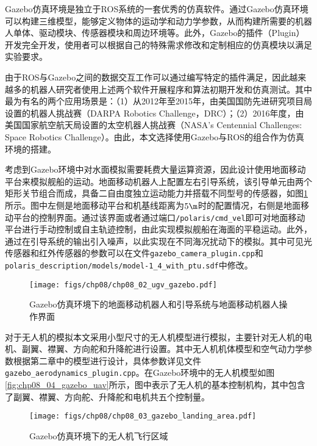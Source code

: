 Gazebo仿真环境是独立于ROS系统的一套优秀的仿真软件。通过Gazebo仿真环境可以构建三维模型，能够定义物体的运动学和动力学参数，从而构建所需要的机器人单体、驱动模块、传感器模块和周边环境等。此外，Gazebo的插件（Plugin）开发完全开发，使用者可以根据自己的特殊需求修改和定制相应的仿真模块以满足实验要求。

由于ROS与Gazebo之间的数据交互工作可以通过编写特定的插件满足，因此越来越多的机器人研究者使用上述两个软件开展程序和算法初期开发和仿真测试。其中最为有名的两个应用场景是：（1）从2012年至2015年，由美国国防先进研究项目局设置的机器人挑战赛（DARPA Robotics Challenge，DRC）\cite{gazebo_darpa}；（2）2016年度，由美国国家航空航天局设置的太空机器人挑战赛（NASA's Centennial Challenges: Space Robotics Challenge）\cite{gazebo_nasa}。由此，本文选择使用Gazebo与ROS的组合作为仿真环境的搭建。

考虑到Gazebo环境中对水面模拟需要耗费大量运算资源，因此设计使用地面移动平台来模拟舰船的运动。地面移动机器人上配置左右引导系统，该引导单元由两个矩形关节组合而成，具备二自由度独立运动能力并搭载不同型号的传感器，如图\ref{fig:chp08_02_ugv_gazebo}所示。图中左侧是地面移动平台和机基线距离为$5 \m$时的配置情况，右侧是地面移动平台的控制界面。通过该界面或者通过端口\texttt{/polaris/cmd\_vel}即可对地面移动平台进行手动控制或自主轨迹控制，由此实现模拟舰船在海面的平稳运动。此外，通过在引导系统的输出引入噪声，以此实现在不同海况扰动下的模拟。其中可见光传感器和红外传感器的参数可以在文件\texttt{gazebo\_camera\_plugin.cpp}和\texttt{polaris\_description/models/model-1\_4\_with\_ptu.sdf}中修改。

\begin{figure}[!t]
	\centering
	\texttt{[image: figs/chp08/chp08\_02\_ugv\_gazebo.pdf]}	
	\caption{Gazebo仿真环境下的地面移动机器人和引导系统与地面移动机器人操作界面}
	\label{fig:chp08_02_ugv_gazebo}
\end{figure}

对于无人机的模拟本文采用小型尺寸的无人机模型进行模拟，主要针对无人机的电机、副翼、襟翼、方向舵和升降舵进行设置。其中无人机机体模型和空气动力学参数根据第二章中的模型进行设计，具体参数详见文件\texttt{gazebo\_aerodynamics\_plugin.cpp}。在Gazebo环境中的无人机模型如图\ref{fig:chp08_04_gazebo_uav}所示，图中表示了无人机的基本控制机构，其中包含了副翼、襟翼、方向舵、升降舵和电机共五个控制量。

\begin{figure}[!ht]
	\centering
	\texttt{[image: figs/chp08/chp08\_03\_gazebo\_landing\_area.pdf]}	
	\caption{Gazebo仿真环境下的无人机飞行区域}
	\label{fig:chp08_03_gazebo_landing_area}
\end{figure}

